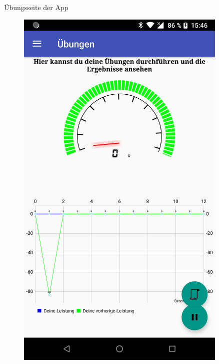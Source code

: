 \documentclass[final,20pt]{beamer}
\newlength{\sepwidth}
\newlength{\colwidth}
\newcommand{\separatorcolumn}{\begin{column}{\sepwidth}\end{column}}
\begin{document}
\begin{frame}[t]
\begin{columns}[t]
\begin{column}{\colwidth}
	\begin{alertblock}{Übungsseite der App}
		\begin{figure}[H]
			\centering
			\includegraphics[width=0.6\colwidth]{pics/device-exercise}
		\end{figure}
	\end{alertblock}
\end{column}

\separatorcolumn
\begin{column}{\colwidth}  
	

\end{column}
\end{columns}
\end{frame}
\end{document}
